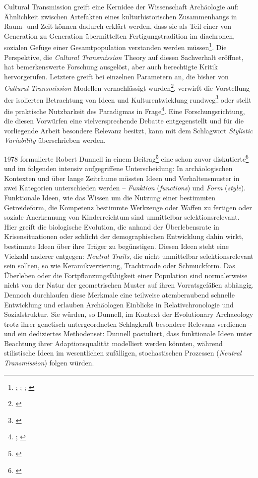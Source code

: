 \documentclass[openany,twoside,twocolumn]{book}
\let\rmarkdownfootnote\footnote%
\def\footnote{\protect\rmarkdownfootnote}
\begin{document}
Cultural Transmission greift eine Kernidee der Wissenschaft Archäologie
auf: Ähnlichkeit zwischen Artefakten eines kulturhistorischen
Zusammenhangs in Raum- und Zeit können dadurch erklärt werden, dass sie
als Teil einer von Generation zu Generation übermittelten
Fertigungstradition im diachronen, sozialen Gefüge einer
Gesamtpopulation verstanden werden müssen\footnote{\textcite{lyman_culture_2001};
  \textcite{lyman_measuring_2000}; \textcite{lyman_rise_1997};
  \textcite{obrien_epistemological_2002}}. Die Perspektive, die
\emph{Cultural Transmission} Theory auf diesen Sachverhalt eröffnet, hat
bemerkenswerte Forschung ausgelöst, aber auch berechtigte Kritik
hervorgerufen. Letztere greift bei einzelnen Parametern an, die bisher
von \emph{Cultural Transmission} Modellen vernachlässigt
wurden\footnote{\textcite{dobres_creativity_2000}}, verwirft die
Vorstellung der isolierten Betrachtung von Ideen und Kulturentwicklung
rundweg\footnote{\textcite{mithen_cognitive_1997}} oder stellt die
praktische Nutzbarkeit des Paradigmas in Frage\footnote{\textcite{dunnell_archaeology_1992};
  \textcite{schiffer_memes_2003}}. Eine Forschungsrichtung, die diesen
Vorwürfen eine vielversprechende Debatte entgegenstellt und für die
vorliegende Arbeit besondere Relevanz besitzt, kann mit dem Schlagwort
\emph{Stylistic Variability} überschrieben werden.

1978 formulierte Robert Dunnell in einem Beitrag\footnote{\textcite{dunnell1978style}}
eine schon zuvor diskutierte\footnote{\textcite{eerkens_cultural_2007}}
und im folgenden intensiv aufgegriffene Unterscheidung: In
archäologischen Kontexten und über lange Zeiträume müssten Ideen und
Verhaltensmuster in zwei Kategorien unterschieden werden --
\emph{Funktion} (\emph{functions}) und \emph{Form} (\emph{style}).
Funktionale Ideen, wie das Wissen um die Nutzung einer bestimmten
Getreideform, die Kompetenz bestimmte Werkzeuge oder Waffen zu fertigen
oder soziale Anerkennung von Kinderreichtum sind unmittelbar
selektionsrelevant. Hier greift die biologische Evolution, die anhand
der Überlebensrate in Krisensituationen oder schlicht der
demographischen Entwicklung dahin wirkt, bestimmte Ideen über ihre
Träger zu begünstigen. Diesen Ideen steht eine Vielzahl anderer
entgegen: \emph{Neutral Traits}, die nicht unmittelbar
selektionsrelevant sein sollten, so wie Keramikverzierung, Trachtmode
oder Schmuckform. Das Überleben oder die Fortpflanzungsfähigkeit einer
Population sind normalerweise nicht von der Natur der geometrischen
Muster auf ihren Vorratsgefäßen abhängig. Dennoch durchlaufen diese
Merkmale eine teilweise atemberaubend schnelle Entwicklung und erlauben
Archäologen Einblicke in Relativchronologie und Sozialstruktur. Sie
würden, so Dunnell, im Kontext der Evolutionary Archaeology trotz ihrer
genetisch untergeordneten Schlagkraft besondere Relevanz verdienen --
und ein dediziertes Methodenset: Dunnell postuliert, dass funktionale
Ideen unter Beachtung ihrer Adaptionsqualität modelliert werden könnten,
während stilistische Ideen im wesentlichen zufälligen, stochastischen
Prozessen (\emph{Neutral Transmission}) folgen würden.
\end{document}
